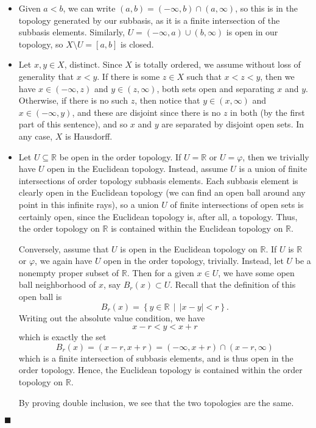 \documentclass[12pt]{article}
\renewcommand{\qed}{\hfill$\blacksquare$}
\renewenvironment{proof}{\begin{addmargin}[1em]{0em}\begin{newproof}}{\end{newproof}\end{addmargin}\qed}
\begin{document}
\begin{proof}
\begin{itemize}
	\item Given $a<b$, we can write $\left(a,b\right) = \left(-\infty,b\right)\cap\left(a,\infty\right)$, so this is in the topology generated by our subbasis, as it is a finite intersection of the subbasis elements. Similarly, $U = \left(-\infty,a\right)\cup\left(b,\infty\right)$ is open in our topology, so $X\setminus U = \left[a,b\right]$ is closed.
	\item Let $x,y\in X$, distinct. Since $X$ is totally ordered, we assume without loss of generality that $x < y$. If there is some $z\in X$ such that $x < z < y$, then we have $x \in \left(-\infty,z\right)$ and $y \in \left(z,\infty\right)$, both sets open and separating $x$ and $y$. Otherwise, if there is no such $z$, then notice that $y \in \left(x,\infty\right)$ and $x \in \left(-\infty,y\right)$, and these are disjoint since there is no $z$ in both (by the first part of this sentence), and so $x$ and $y$ are separated by disjoint open sets. In any case, $X$ is Hausdorff.
	\item Let $U\subseteq \mathbb{R}$ be open in the order topology. If $U=\mathbb{R}$ or $U=\varphi$, then we trivially have $U $ open in the Euclidean topology. Instead, assume $U$ is a union of finite intersections of order topology subbasis elements. Each subbasis element is clearly open in the Euclidean topology (we can find an open ball around any point in this infinite rays), so a union $U$ of finite intersections of open sets is certainly open, since the Euclidean topology is, after all, a topology. Thus, the order topology on $\mathbb{R}$ is contained within the Euclidean topology on $\mathbb{R}$.
	
	Conversely, assume that $U$ is open in the Euclidean topology on $\mathbb{R}$. If $U$ is $\mathbb{R}$ or $\varphi$, we again have $U$ open in the order topology, trivially. Instead, let $U$ be a nonempty proper subset of $\mathbb{R}$. Then for a given $x\in U$, we have some open ball neighborhood of $x$, say $B_r\left(x\right) \subset U$. Recall that the definition of this open ball is $$ B_r\left(x\right) = \left\{ y\in \mathbb{R} \, \middle| \, \left|x-y\right| < r\right\}. $$ Writing out the absolute value condition, we have $$ x-r < y < x+r $$ which is exactly the set $$B_r\left(x\right)= \left(x-r,x+r\right) = \left(-\infty,x+r\right)\cap \left(x-r,\infty\right)$$ which is a finite intersection of subbasis elements, and is thus open in the order topology. Hence, the Euclidean topology is contained within the order topology on $\mathbb{R}$.
	
	By proving double inclusion, we see that the two topologies are the same.
\end{itemize}
\end{proof}
\end{document}
